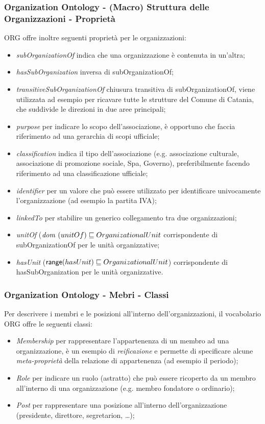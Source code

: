 \documentclass[8pt]{beamer}
\begin{document}
\begin{frame}
  \frametitle{Organization Ontology - (Macro) Struttura delle Organizzazioni - Propriet\`a}
  
  ORG offre inoltre seguenti propriet\`a per le organizzazioni:  
  \begin{itemize}[<+->]
   \item \emph{subOrganizationOf} indica che una organizzazione \`e contenuta in un'altra;
   \item \emph{hasSubOrganization} inversa di subOrganizationOf;
   \item \emph{transitiveSubOrganizationOf} chiusura transitiva di subOrganizationOf, viene utilizzata
   ad esempio per ricavare tutte le strutture del Comune di Catania, che suddivide le direzioni in
   due aree principali;
   \item \emph{purpose} per indicare lo scopo dell'associazione, \`e opportuno che faccia riferimento
   ad una gerarchia di scopi ufficiale;
   \item \emph{classification} indica il tipo dell'associazione (e.g. associazione culturale, associazione di
   promozione sociale, Spa, Governo), preferibilmente facendo riferimento ad una classificazione ufficiale;
   \item \emph{identifier} per un valore che pu\`o essere utilizzato per identificare univocamente l'organizzazione
   (ad esempio la partita IVA);
   \item \emph{linkedTo} per stabilire un generico collegamento tra due organizzazioni;
   \item \emph{unitOf} ($\mathit{dom}~(unitOf)\sqsubseteq OrganizationalUnit$ corrispondente di subOrganizationOf per
   le unit\`a organizzative;
   \item \emph{hasUnit} ($\mathsf{range}(hasUnit) \sqsubseteq OrganizationalUnit$) corrispondente di hasSubOrganization per
   le unit\`a organizzative.
  \end{itemize}
\end{frame}

\begin{frame}
  \frametitle{Organization Ontology - Mebri - Classi}
  
  Per descrivere i membri e le posizioni all'interno dell'organizzazioni, il vocabolario ORG offre le seguenti classi:  
  \begin{itemize}[<+->]
   \item \emph{Membership} per rappresentare l'appartenenza di un membro ad una organizzazione, \`e un esempio
   di \emph{reificazione} e permette di specificare alcune \emph{meta-propriet\`a} della relazione di appartenenza (ad esempio
   il periodo);
   \item \emph{Role} per indicare un ruolo (astratto) che pu\`o essere ricoperto da un membro all'interno di una organizzazione (e.g. membro
   fondatore o ordinario);
   \item \emph{Post} per rappresentare una posizione all'interno dell'organizzazione (presidente, direttore, segretarion, \ldots);   
  \end{itemize}
\end{frame}
\end{document}
